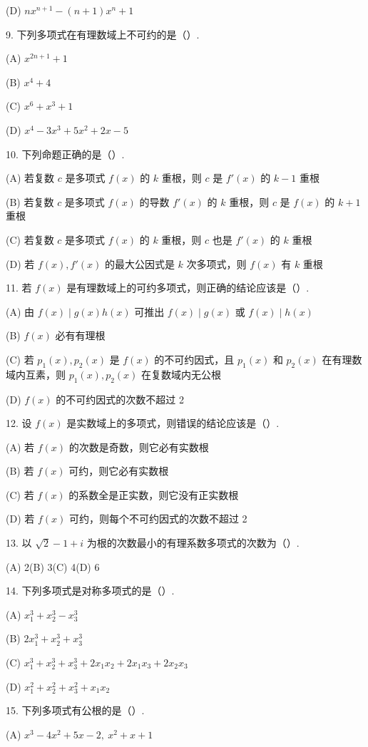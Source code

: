 \documentclass[UTF8,12pt,a4paper,fontset=fandol]{ctexart}
\begin{document}
(D) $nx^{n+1}-(n+1)x^n+1$

9. 下列多项式在有理数域上不可约的是（\quad ）.

(A) $x^{2n+1}+1$

(B) $x^4+4$

(C) $x^6+x^3+1$

(D) $x^4-3x^3+5x^2+2x-5$

10. 下列命题正确的是（\quad ）.

(A) 若复数 $c$ 是多项式 $f(x)$ 的 $k$ 重根，则 $c$ 是 $f'(x)$ 的 $k-1$ 重根

(B) 若复数 $c$ 是多项式 $f(x)$ 的导数 $f'(x)$ 的 $k$ 重根，则 $c$ 是 $f(x)$ 的 $k+1$ 重根

(C) 若复数 $c$ 是多项式 $f(x)$ 的 $k$ 重根，则 $c$ 也是 $f'(x)$ 的 $k$ 重根

(D) 若 $f(x),f'(x)$ 的最大公因式是 $k$ 次多项式，则 $f(x)$ 有 $k$ 重根

11. 若 $f(x)$ 是有理数域上的可约多项式，则正确的结论应该是（\quad ）.

(A) 由 $f(x)\mid g(x)h(x)$ 可推出 $f(x)\mid g(x)$ 或 $f(x)\mid h(x)$

(B) $f(x)$ 必有有理根

(C) 若 $p_1(x),p_2(x)$ 是 $f(x)$ 的不可约因式，且 $p_1(x)$ 和 $p_2(x)$ 在有理数域内互素，则 $p_1(x),p_2(x)$ 在复数域内无公根

(D) $f(x)$ 的不可约因式的次数不超过 2

12. 设 $f(x)$ 是实数域上的多项式，则错误的结论应该是（\quad ）.

(A) 若 $f(x)$ 的次数是奇数，则它必有实数根

(B) 若 $f(x)$ 可约，则它必有实数根

(C) 若 $f(x)$ 的系数全是正实数，则它没有正实数根

(D) 若 $f(x)$ 可约，则每个不可约因式的次数不超过 2

13. 以 $\sqrt{2}-1+i$ 为根的次数最小的有理系数多项式的次数为（\quad ）.

(A) 2\quad (B) 3\quad (C) 4\quad (D) 6

14. 下列多项式是对称多项式的是（\quad ）.

(A) $x_1^3+x_2^3-x_3^3$

(B) $2x_1^3+x_2^3+x_3^3$

(C) $x_1^3+x_2^3+x_3^3+2x_1x_2+2x_1x_3+2x_2x_3$

(D) $x_1^2+x_2^2+x_3^2+x_1x_2$

15. 下列多项式有公根的是（\quad ）.

(A) $x^3-4x^2+5x-2,\ x^2+x+1$
\end{document}
